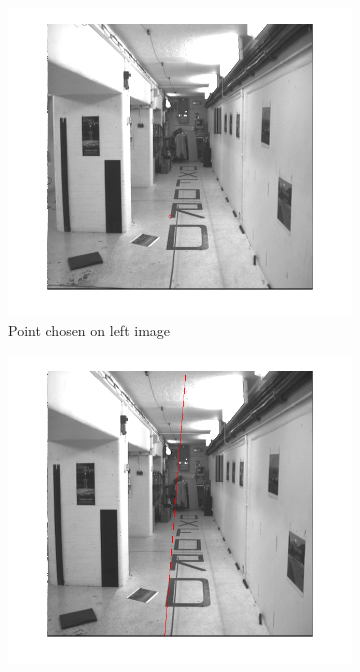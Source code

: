 \documentclass{paper}
\begin{document}
\begin{figure}
\centering
\begin{subfigure}{0.49\textwidth}
   \includegraphics[width=\textwidth]{corridor_epipolar_line}
   \caption{Point chosen on left image}
   \label{fig:corridor_point}
\end{subfigure}
\begin{subfigure}{0.49\textwidth}
   \includegraphics[width=\textwidth]{corridor_epipolar_line_r}

\end{subfigure}
\end{figure}
\end{document}
